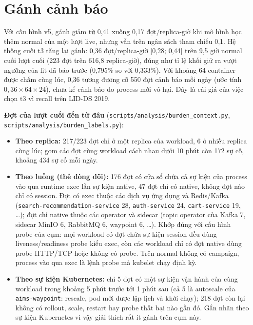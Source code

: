 \section{Gánh cảnh báo}\label{sec:limits-burden}

Với cấu hình v5, gánh giảm từ 0,41 xuống 0,17 đợt/replica-giờ khi mô hình học thêm normal của một lượt live, nhưng vẫn trên ngân sách tham chiếu 0,1. Hệ thống cuối t3 tăng lại gánh: 0,36 đợt/replica-giờ {[}0,28; 0,44{]} trên 9,5 giờ normal cuối lượt cuối (223 đợt trên 616,8 replica-giờ), đúng như tỉ lệ khối giữ ra vượt ngưỡng của fit đã báo trước (0,795\% so với 0,333\%). Với khoảng 64 container được chấm cùng lúc, 0,36 tương đương cỡ 550 đợt cảnh báo mỗi ngày (ước tính $0{,}36 \times 64 \times 24$), chưa kể cảnh báo do process mới vô hại. Đây là cái giá của việc chọn t3 vì recall trên LID-DS 2019.

\textbf{Đợt của lượt cuối đến từ đâu} (\texttt{scripts/\allowbreak{}analysis/\allowbreak{}burden\_\allowbreak{}context.py}, \texttt{scripts/\allowbreak{}analysis/\allowbreak{}burden\_\allowbreak{}labels.py}):
\begin{itemize}
\tightlist
\item
  \textbf{Theo replica:} 217/223 đợt chỉ ở một replica của workload, 6 ở nhiều replica cùng lúc; gom các đợt cùng workload cách nhau dưới 10 phút còn 172 sự cố, khoảng 434 sự cố mỗi ngày.
\item
  \textbf{Theo luồng (thẻ dòng dõi):} 176 đợt có cửa sổ chứa cả sự kiện của process vào qua runtime exec lẫn sự kiện native, 47 đợt chỉ có native, không đợt nào chỉ có session. Đợt có exec thuộc các dịch vụ ứng dụng và Redis/Kafka (\texttt{search-\allowbreak{}recommendation-\allowbreak{}service} 28, \texttt{auth-\allowbreak{}service} 24, \texttt{cart-\allowbreak{}service} 19, \ldots); đợt chỉ native thuộc các operator và sidecar (topic operator của Kafka 7, sidecar MinIO 6, RabbitMQ 6, waypoint 6, \ldots). Khớp đúng với cấu hình probe của cụm: mọi workload có đợt chứa sự kiện session đều dùng liveness/readiness probe kiểu exec, còn các workload chỉ có đợt native dùng probe HTTP/TCP hoặc không có probe. Trên normal không có campaign, process vào qua exec là lệnh probe mà kubelet chạy định kỳ.
\item
  \textbf{Theo sự kiện Kubernetes:} chỉ 5 đợt có một sự kiện vận hành của cùng workload trong khoảng 5 phút trước tới 1 phút sau (cả 5 là autoscale của \texttt{aims-\allowbreak{}waypoint}: rescale, pod mới được lập lịch và khởi chạy); 218 đợt còn lại không có rollout, scale, restart hay probe thất bại nào gần đó. Gắn nhãn theo sự kiện Kubernetes vì vậy giải thích rất ít gánh trên cụm này.
\end{itemize}

